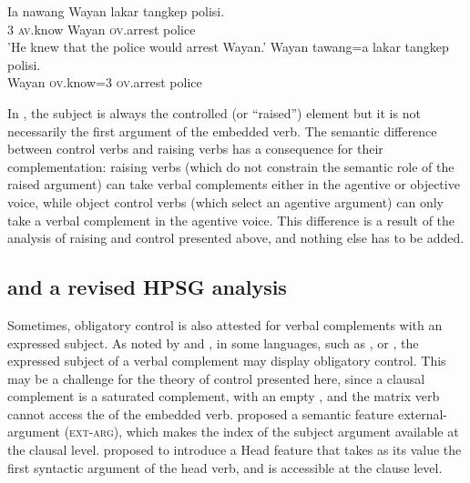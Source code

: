 \documentclass[output=paper
	        ,collection
	        ,collectionchapter
 	        ,biblatex
                ,babelshorthands
                ,newtxmath
                ,draftmode
                ,colorlinks, citecolor=brown
]{langscibook}
\begin{document}
\ex
\label{ov}
\gll Ia nawang           Wayan lakar  tangkep            polisi.\\
     3  \textsc{av}.know Wayan \FUT{} \textsc{ov}.arrest police\\
\glt 'He knew that the police would arrest Wayan.'
\ex
\label{rais-ov}
\gll Wayan tawang=a           lakar  tangkep            polisi. \\
     Wayan \textsc{ov}.know=3 \FUT{} \textsc{ov}.arrest police\\ 
\zl


In , the subject is always the controlled (or ``raised'') element but it is not
necessarily the first argument of the embedded verb. The semantic difference between control verbs
and raising verbs has a consequence for their complementation: raising verbs (which do not constrain
the semantic role of the raised argument) can take verbal complements either in the agentive or
objective voice, while object control verbs (which select an agentive argument) can only take a
verbal complement in the agentive voice. This difference is a result of the analysis of raising and
control presented above, and nothing else has to be added.



\subsection{\xarg and a revised HPSG analysis}\label{section-xarg}


Sometimes, obligatory control is also attested for verbal complements with an expressed subject.  As
noted by \citet{Zec87a-u,Farkas1988} and \citet[--116]{GH2001a-u}, in some languages, such
as ,  \citep{Kuno76a-u,Iida96a-u} or  \citep{Karimi2008},
the expressed subject of a verbal complement may display obligatory control. This may be a challenge
for the theory of control presented here, since a clausal complement is a saturated complement, with
an empty \subjl, and the matrix verb cannot access the \subjv of the embedded verb. \citet[]{SP91a-u} proposed a semantic feature external-argument (\textsc{ext-arg}), which makes the index of the
subject argument available at the clausal level.  \citet{Sag2007a}\addpages proposed to introduce a Head
feature \xarg that takes as its value the first syntactic argument of the head verb, and is
accessible at the clause level.
\end{document}
